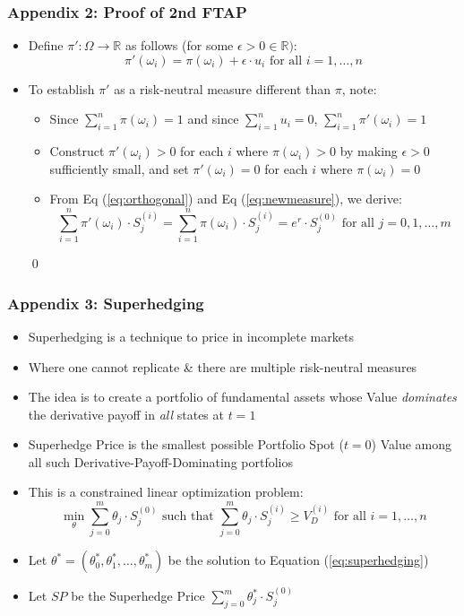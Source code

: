 \documentclass{beamer}
\begin{document}
\begin{frame}
\frametitle{Appendix 2: Proof of 2nd FTAP}
\begin{itemize}
\item Define $\pi' : \Omega \rightarrow \mathbb{R}$ as follows (for some $\epsilon > 0 \in \mathbb{R})$:
\begin{equation}
\pi'(\omega_i) = \pi(\omega_i) + \epsilon \cdot u_i \mbox{ for all } i = 1, \ldots, n \label{eq:newmeasure}
\end{equation}
\item To establish $\pi'$ as a risk-neutral measure different than $\pi$, note:
\begin{itemize}
\item Since $\sum_{i=1}^n \pi(\omega_i) = 1$ and since $\sum_{i=1}^n u_i = 0$, $\sum_{i=1}^n \pi'(\omega_i) = 1$
\item Construct $\pi'(\omega_i) > 0$ for each $i$ where $\pi(\omega_i) > 0$ by making $\epsilon > 0$ sufficiently small, and set $\pi'(\omega_i) = 0$ for each $i$ 
where $\pi(\omega_i) = 0$
\item From Eq (\ref{eq:orthogonal}) and Eq (\ref{eq:newmeasure}), we derive:
$$\sum_{i=1}^n \pi'(\omega_i) \cdot S_j^{(i)} = \sum_{i=1}^n \pi(\omega_i) \cdot S_j^{(i)} = e^r \cdot S_j^{(0)} \mbox{ for all } j = 0, 1, \ldots, m$$
\end{itemize}
\qed
\end{itemize}
\end{frame}

\begin{frame}
\frametitle{Appendix 3: Superhedging}
\begin{itemize}
\item Superhedging is a technique to price in incomplete markets
\item Where one cannot replicate \& there are multiple risk-neutral measures
\item The idea is to create a portfolio of fundamental assets whose Value {\em dominates} the derivative payoff in {\em all} states at $t=1$
\item Superhedge Price is the smallest possible Portfolio Spot ($t=0$) Value among all such Derivative-Payoff-Dominating portfolios
\item This is a constrained linear optimization problem:
\begin{equation}
\min_{\theta} \sum_{j=0}^m \theta_j \cdot S_j^{(0)} \mbox{ such that } \sum_{j=0}^m \theta_j \cdot S_j^{(i)} \geq V_D^{(i)} \mbox{ for all } i = 1, \ldots, n \label{eq:superhedging}
\end{equation}
\item Let $\theta^* = (\theta_0^*, \theta_1^*, \ldots, \theta_m^*)$ be the solution to Equation (\ref{eq:superhedging})
\item Let $SP$ be the Superhedge Price $\sum_{j=0}^m \theta_j^* \cdot S_j^{(0)}$
\end{itemize}
\end{frame}
\end{document}
